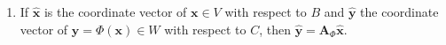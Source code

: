 \begin{enumerate}
\begin{enumerate}
        \item If $\hat{\bm{x}}$ is the coordinate vector of $\bm{x} \in V$ with respect to $B$ and $\hat{\bm{y}}$ the coordinate vector of $\bm{y} = \Phi(\bm{x}) \in W$ with respect to $C$, then $\hat{\bm{y}} = \bm{A}_\Phi \hat{\bm{x}}$.
        \hfill \cite{mfml/book/mml/Deisenroth-Faisal-Ong}
    \end{enumerate}    
\end{enumerate}

























































